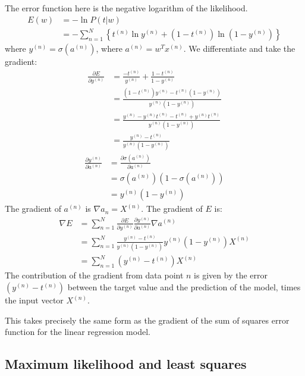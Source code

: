 \documentclass[a4paper,12pt]{article}
\begin{document}
The error function here is the negative logarithm of the likelihood. 
\begin{align*}
E(w) &= -\ln P(t|w) \\
	 &= -\sum_{n=1}^N \left\{ t^{(n)}\ln y^{(n)} + (1-t^{(n)}) \ln (1 - y^{(n)}) \right\}
\end{align*}
where $y^{(n)} = \sigma(a^{(n)})$, where $a^{(n)} = w^T x^{(n)}$. We differentiate and take the gradient: 
\begin{align*}
\frac{\partial E}{\partial y^{(n)}} &= \frac{-t^{(n)}}{y^{(n)}} + \frac{1-t^{(n)}}{1-y^{(n)}} \\
	&= \frac{(1-t^{(n)})y^{(n)} - t^{(n)}(1-y^{(n)})}{y^{(n)}(1-y^{(n)})}\\
	&= \frac{y^{(n)} - y^{(n)}t^{(n)} - t^{(n)} + y^{(n)}t^{(n)}}{y^{(n)}(1-y^{(n)})} \\
	&= \frac{y^{(n)} - t^{(n)}}{y^{(n)}(1-y^{(n)})}
\end{align*}
\begin{align*}
\frac{\partial y^{(n)}}{\partial a^{(n)}} &= \frac{\partial \sigma(a^{(n)})}{\partial a^{(n)}} \\
	&= \sigma(a^{(n)})(1-\sigma(a^{(n)})) \\
	&= y^{(n)}(1-y^{(n)}) 
\end{align*}
The gradient of $a^{(n)}$ is $\nabla a_n = X^{(n)}$. The gradient of $E$ is: 
\begin{align*}
\nabla E &= \sum_{n=1}^N \frac{\partial E}{\partial y^{(n)}} \frac{\partial y^{(n)}}{\partial a^{(n)}} \nabla a^{(n)} \\
		 &= \sum_{n=1}^N \frac{y^{(n)} - t^{(n)}}{y^{(n)}(1-y^{(n)})} y^{(n)}(1-y^{(n)}) X^{(n)} \\
		 &= \sum_{n=1}^N (y^{(n)} - t^{(n)}) X^{(n)}
\end{align*}
The contribution of the gradient from data point $n$ is given by the error $(y^{(n)}-t^{(n)})$ between the target value and the prediction of the model, times the input vector $X^{(n)}$. 

This takes precisely the same form as the gradient of the sum of squares error function for the linear regression model. 

\subsection{Maximum likelihood and least squares}
\end{document}
